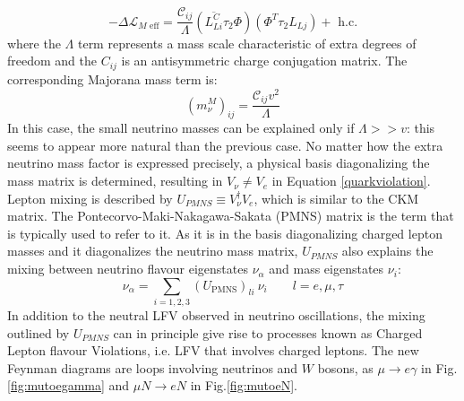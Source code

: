 \begin{equation}
-\Delta \mathscr{L}_{M \text { eff}}=\frac{\mathcal{C}_{i j}}{\Lambda}\left(\overline{L_{L i}^C} \tau_2 \Phi\right)\left(\Phi^T \tau_2 L_{L j}\right)+\text { h.c.}
\end{equation}
where the $\Lambda$ term represents a mass scale characteristic of extra degrees of freedom and the $C_{ij}$ is an antisymmetric charge conjugation matrix. The corresponding Majorana mass term is:
\begin{equation}
\left(m_\nu^M\right)_{i j}=\frac{\mathcal{C}_{i j} v^2}{\Lambda}
\end{equation}
In this case, the small neutrino masses can be explained only if $\Lambda > > v$: this seems to appear more natural than the previous case. No matter how the extra neutrino mass factor is expressed precisely, a physical basis diagonalizing the mass matrix is determined, resulting in $V_{\nu} \neq V_e$ in Equation \ref{quarkviolation}. Lepton mixing is described by $U_{PMNS} \equiv V_{\nu}^{\dagger} V_e$, which is similar to the CKM matrix. The Pontecorvo-Maki-Nakagawa-Sakata (PMNS) matrix is the term that is typically used to refer to it. As it is in the basis diagonalizing charged lepton masses and it diagonalizes the neutrino mass matrix, $U_{PMNS}$ also explains the mixing between neutrino flavour eigenstates $\nu_{\alpha}$ and mass eigenstates $\nu_i$:
\begin{equation}
\nu_\alpha=\sum_{i=1,2,3}\left(U_{\mathrm{PMNS}}\right)_{l i} \ \nu_i \qquad l=e, \mu, \tau
\end{equation}
In addition to the neutral LFV observed in neutrino oscillations, the mixing outlined by $U_{PMNS}$ can in principle give rise to processes known as Charged Lepton flavour Violations, i.e. LFV that involves charged leptons. The new Feynman diagrams are loops involving neutrinos and $W$ bosons, as $\mu \rightarrow e \gamma$ in Fig.\ref{fig:mutoegamma} and $\mu N \rightarrow e N$ in Fig.\ref{fig:mutoeN}. 



